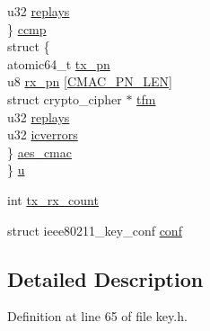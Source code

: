 \begin{DoxyCompactItemize}
\begin{tabbing}
\>\>u32 \hyperlink{structieee80211__key_a0c08b132b796ebfdeda0499ae965b637}{replays}\\
\>\} \hyperlink{structieee80211__key_a7f707fa843bd338b94e1d10d95e88f11}{ccmp}\\
\>struct \{\\
\>\>atomic64\_t \hyperlink{structieee80211__key_a151a5bf95479b1130b341b412e6e3705}{tx\_pn}\\
\>\>u8 \hyperlink{structieee80211__key_af268ed760198a17a7ecd9c352f6f1fc5}{rx\_pn} \mbox{[}\hyperlink{key_8h_a07fe3d0d5319da1976cbe16e6dcdb415}{CMAC\_PN\_LEN}\mbox{]}\\
\>\>struct crypto\_cipher $\ast$ \hyperlink{structieee80211__key_a45576ea98555983d71e70badb9035f67}{tfm}\\
\>\>u32 \hyperlink{structieee80211__key_a0c08b132b796ebfdeda0499ae965b637}{replays}\\
\>\>u32 \hyperlink{structieee80211__key_a6751db90f0ca17fdb752baeb6f8d5152}{icverrors}\\
\>\} \hyperlink{structieee80211__key_affdec9171aa9c62e512d1080c1c45e2a}{aes\_cmac}\\
\} \hyperlink{structieee80211__key_aaf1be5c7d7653b795e11cb959246ee99}{u}\\

\end{tabbing}\item 
int \hyperlink{structieee80211__key_aff97ed740b6f262a845615cf7e63af70}{tx\-\_\-rx\-\_\-count}
\item 
struct ieee80211\-\_\-key\-\_\-conf \hyperlink{structieee80211__key_ac356e71d3ee661c89f43f272674ca2d6}{conf}
\end{DoxyCompactItemize}


\subsection{Detailed Description}


Definition at line 65 of file key.\-h.



